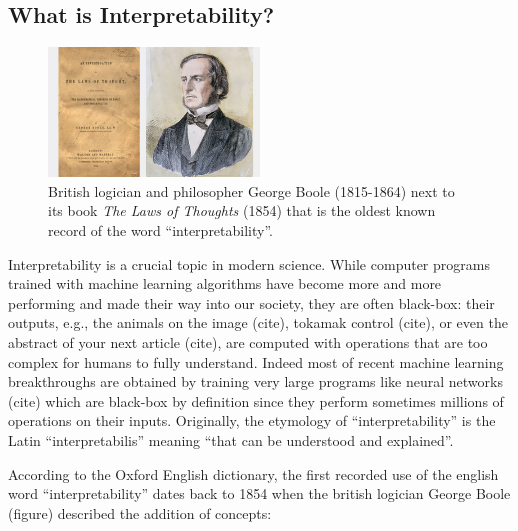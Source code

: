 \subsection{What is Interpretability?}
\begin{figure}[htbp]
    \centering
    \includegraphics[width=0.5\textwidth]{images/images_intro/gboole.jpg}
    \caption{British logician and philosopher George Boole (1815-1864) next to its book \textit{The Laws of Thoughts} (1854) that is the oldest known record of the word ``interpretability''.}
\end{figure}

Interpretability is a crucial topic in modern science. While computer programs trained with machine learning algorithms have become more and more performing and made their way into our society, they are often black-box: their outputs, e.g., the animals on the image (cite), tokamak control (cite), or even the abstract of your next article (cite), are computed with operations that are too complex for humans to fully understand.
Indeed most of recent machine learning breakthroughs are obtained by training very large programs like neural networks (cite) which are black-box by definition since they perform sometimes millions of operations on their inputs.
Originally, the etymology of ``interpretability'' is the Latin ``interpretabilis'' meaning ``that can be understood and explained''.

According to the Oxford English dictionary, the first recorded use of the english word ``interpretability'' dates back to 1854 when the british logician George Boole (figure) described the addition of concepts:

